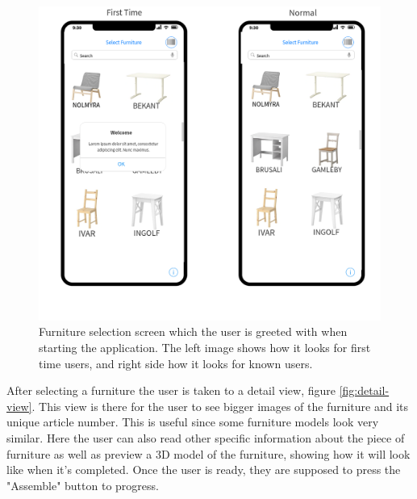 \begin{figure}[hbtp]
\begin{center}
\includegraphics[height = 0.4\textheight]{./Images/Furniture_Select.png}
\caption{Furniture selection screen which the user is greeted with when starting the application. The left image shows how it looks for first time users, and right side how it looks for known users.}
\label{fig:furniture-select}
\end{center}
\end{figure}

After selecting a furniture the user is taken to a detail view, figure \ref{fig:detail-view}. This view is there for the user to see bigger images of the furniture and its unique article number. This is useful since some furniture models look very similar. Here the user can also read other specific information about the piece of furniture as well as preview a 3D model of the furniture, showing how it will look like when it's completed. Once the user is ready, they are supposed to press the "Assemble" button to progress.
 
